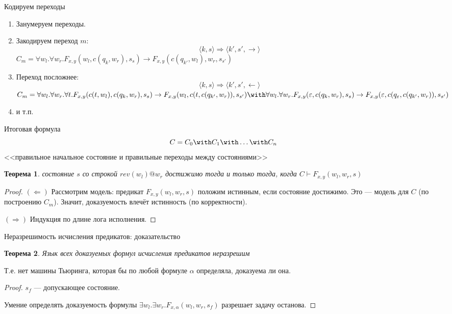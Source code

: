 \documentclass[aspectratio=169]{beamer}
\newtheorem{thm}{Теорема}[section]
\begin{document}
\begin{frame}{Кодируем переходы}
\begin{enumerate}
\item Занумеруем переходы.\pause
\item Закодируем переход $m$: $$\langle k, s \rangle \Rightarrow \langle k', s', \rightarrow \rangle$$
$C_m = \forall w_l.\forall w_r.F_{x,y}(w_l,c(q_k,w_r),s_s) \rightarrow F_{x,y}(c(q_{k'},w_l),w_r,s_{s'})$\pause

\item Переход посложнее:
$$\langle k, s \rangle \Rightarrow \langle k', s', \leftarrow \rangle$$
$C_m = \forall w_l.\forall w_r.\forall t.F_{x,y}(c(t,w_l),c(q_k,w_r),s_s) \rightarrow F_{x,y}(w_l,c(t,c(q_{k'},w_r)),s_{s'}) \with
\forall w_l.\forall w_r.F_{x,y}(\varepsilon,c(q_k,w_r),s_s) \rightarrow F_{x,y}(\varepsilon,c(q_\varepsilon,c(q_{k'},w_r)),s_{s'})$\\
\pause
\item и т.п.
\end{enumerate}
\end{frame}

\begin{frame}{Итоговая формула}
$$C = C_0 \with C_1 \with \dots \with C_n$$
<<правильное начальное состояние и правильные переходы между состояниями>>\pause

\begin{thm}
состояние $s$ со строкой $rev(w_l)@w_r$ достижимо тогда и только тогда, когда
$C \vdash F_{x,y}(w_l,w_r,s)$\pause
\end{thm}
\begin{proof}
$(\Leftarrow)$ Рассмотрим модель: предикат $F_{x,y}(w_l,w_r,s)$ положим истинным, если состояние достижимо. \pause
Это --- модель для $C$ (по построению $C_m$). \pause
Значит, доказуемость влечёт истинность (по корректности). \pause

$(\Rightarrow)$ Индукция по длине лога исполнения.
\end{proof}
\end{frame}

\begin{frame}{Неразрешимость исчисления предикатов: доказательство}
\begin{thm}Язык всех доказуемых формул исчисления предикатов неразрешим\end{thm}
Т.е. нет машины Тьюринга, которая бы по любой формуле $\alpha$ определяла, доказуема ли она.\pause
\begin{proof} $s_f$ --- допускающее состояние.\pause

Умение определять доказуемость формулы $\exists w_l.\exists w_r.F_{x,\alpha}(w_l,w_r,s_f)$ разрешает задачу останова.
\end{proof}
\end{frame}
\end{document}
